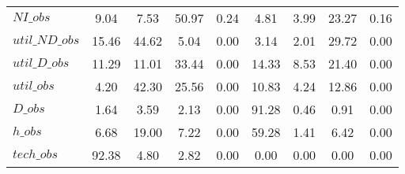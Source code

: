 \begin{center}
\begin{longtable}{lcccccccc}
$NI\_obs        $	 & 	         9.04	 & 	         7.53	 & 	        50.97	 & 	         0.24	 & 	         4.81	 & 	         3.99	 & 	        23.27	 & 	         0.16 \\ 
$util\_ND\_obs  $	 & 	        15.46	 & 	        44.62	 & 	         5.04	 & 	         0.00	 & 	         3.14	 & 	         2.01	 & 	        29.72	 & 	         0.00 \\ 
$util\_D\_obs   $	 & 	        11.29	 & 	        11.01	 & 	        33.44	 & 	         0.00	 & 	        14.33	 & 	         8.53	 & 	        21.40	 & 	         0.00 \\ 
$util\_obs      $	 & 	         4.20	 & 	        42.30	 & 	        25.56	 & 	         0.00	 & 	        10.83	 & 	         4.24	 & 	        12.86	 & 	         0.00 \\ 
$D\_obs         $	 & 	         1.64	 & 	         3.59	 & 	         2.13	 & 	         0.00	 & 	        91.28	 & 	         0.46	 & 	         0.91	 & 	         0.00 \\ 
$h\_obs         $	 & 	         6.68	 & 	        19.00	 & 	         7.22	 & 	         0.00	 & 	        59.28	 & 	         1.41	 & 	         6.42	 & 	         0.00 \\ 
$tech\_obs      $	 & 	        92.38	 & 	         4.80	 & 	         2.82	 & 	         0.00	 & 	         0.00	 & 	         0.00	 & 	         0.00	 & 	         0.00 \\ 
\end{longtable}
 \end{center}
